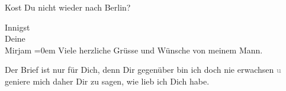 \pstart
           Ko{\geminationm}st Du nicht wieder nach Berlin?\pend
           
\pstart
           Innigst{\\[\baselineskip]}Deine{\\[\baselineskip]}\spacefill\mbox{Mirjam}\pend
           \leftskip=0em{}
\pstart
           \noindent{}Viele herzliche Grüsse und Wünsche von meinem Mann.\pend
           
\pstart
           Der Brief ist nur für Dich, denn Dir gegenüber bin ich doch nie erwachsen
                     \textcolor{gray}{u} geniere mich daher Dir zu sagen, wie lieb ich Dich
                  habe.\pend
           \endnumbering{}  
      